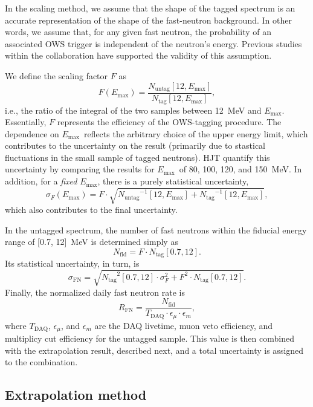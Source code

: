 \documentclass[../thesis.tex]{subfiles}
\begin{document}
In the scaling method, we assume that the shape of the tagged spectrum is an
accurate representation of the shape of the fast-neutron background. In other
words, we assume that, for any given fast neutron, the probability of an
associated OWS trigger is independent of the neutron's energy. Previous studies
within the collaboration have supported the validity of this assumption.

\def\emax{\ensuremath{E_\mathrm{max}}} \def\ntag{\ensuremath{N_\mathrm{tag}}}
\def\nuntag{\ensuremath{N_\mathrm{untag}}}

We define the scaling factor $F$ as \[ F(\emax) = \frac{\nuntag[12,
    \emax]}{\ntag[12, \emax]}, \] i.e., the ratio of the integral of the two
samples between 12~MeV and \emax. Essentially, $F$ represents the efficiency of
the OWS-tagging procedure. The dependence on \emax\ reflects the arbitrary
choice of the upper energy limit, which contributes to the uncertainty on the
result (primarily due to stastical fluctuations in the small sample of tagged
neutrons). HJT quantify this uncertainty by comparing the results for \emax\ of
80, 100, 120, and 150~MeV. In addition, for a \emph{fixed} \emax, there is a
purely statistical uncertainty,
\[ \sigma_F(\emax) = F \cdot \sqrt{\nuntag^{-1}[12, \emax] + \ntag^{-1}[12,
    \emax]},
\]
which also contributes to the final uncertainty.

\def\nfn{\ensuremath{N_\mathrm{fid}}} \def\rfn{\ensuremath{R_\mathrm{FN}}}

In the untagged spectrum, the number of fast neutrons within the fiducial energy
range of [0.7, 12]~MeV is determined simply as
\[ \nfn = F \cdot \ntag[0.7, 12]. \] Its statistical uncertainty, in turn, is
\begin{equation}
  \label{eq:eq:fastn_scal_unc}
  \sigma_\mathrm{FN} = \sqrt{\ntag^2[0.7, 12]
    \cdot \sigma_F^2 + F^2 \cdot \ntag[0.7, 12]}.
\end{equation}
Finally, the normalized daily fast neutron rate is
\begin{equation}
  \label{eq:fastn_rate}
  \rfn = \frac{\nfn}{T_\mathrm{DAQ} \cdot \epsilon_\mu \cdot \epsilon_m},
\end{equation}
where $T_\mathrm{DAQ}$, $\epsilon_\mu$, and $\epsilon_m$ are the DAQ livetime,
muon veto efficiency, and multiplicy cut efficiency for the untagged
sample. This value is then combined with the extrapolation result, described
next, and a total uncertainty is assigned to the combination.

\subsection{Extrapolation method}
\label{sec:fastn_extrap}
\end{document}
